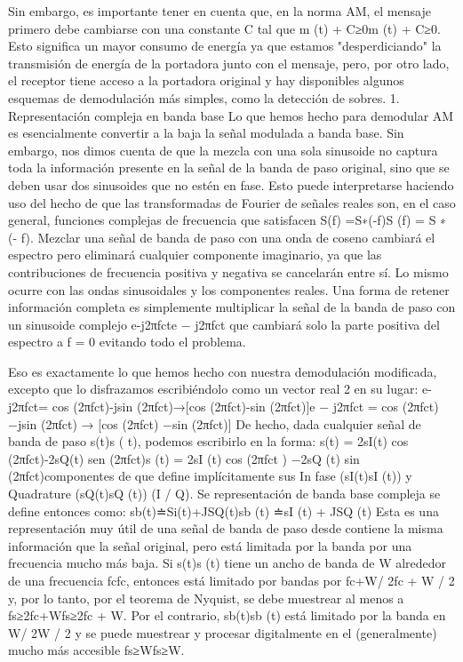 Sin embargo, es importante tener en cuenta que, en la norma AM, el mensaje primero debe cambiarse con una constante C tal que m (t) + C≥0m (t) + C≥0. Esto significa un mayor consumo de energía ya que estamos "desperdiciando" la transmisión de energía de la portadora junto con el mensaje, pero, por otro lado, el receptor tiene acceso a la portadora original y hay disponibles algunos esquemas de demodulación más simples, como la detección de sobres.
   1. Representación compleja en banda base
Lo que hemos hecho para demodular AM es esencialmente convertir a la baja la señal modulada a banda base. Sin embargo, nos dimos cuenta de que la mezcla con una sola sinusoide no captura toda la información presente en la señal de la banda de paso original, sino que se deben usar dos sinusoides que no estén en fase. Esto puede interpretarse haciendo uso del hecho de que las transformadas de Fourier de señales reales son, en el caso general, funciones complejas de frecuencia que satisfacen S(f) =S∗(-f)S (f) = S ∗ (- f). Mezclar una señal de banda de paso con una onda de coseno cambiará el espectro pero eliminará cualquier componente imaginario, ya que las contribuciones de frecuencia positiva y negativa se cancelarán entre sí. Lo mismo ocurre con las ondas sinusoidales y los componentes reales. 
Una forma de retener información completa es simplemente multiplicar la señal de la banda de paso con un sinusoide complejo e-j2πfcte − j2πfct que cambiará solo la parte positiva del espectro a f = 0 evitando todo el problema.
  

Eso es exactamente lo que hemos hecho con nuestra demodulación modificada, excepto que lo disfrazamos escribiéndolo como un vector real 2 en su lugar: 
e-j2πfct= cos (2πfct)-jsin (2πfct)→[cos (2πfct)-sin (2πfct)]e − j2πfct = cos⁡ (2πfct) −jsin⁡ (2πfct) → [cos⁡ (2πfct) −sin⁡ (2πfct)]
De hecho, dada cualquier señal de banda de paso s(t)s ( t), podemos escribirlo en la forma: 
s(t) = 2sI(t) cos (2πfct)-2sQ(t) sen (2πfct)s (t) = 2sI (t) cos⁡ (2πfct ) −2sQ (t) sin⁡ (2πfct)componentes de
que define implícitamente sus In fase (sI(t)sI (t)) y Quadrature (sQ(t)sQ (t)) (I / Q). Se representación de banda base compleja se define entonces como: 
sb(t)≐Si(t)+JSQ(t)sb (t) ≐sI (t) + JSQ (t)
Esta es una representación muy útil de una señal de banda de paso desde contiene la misma información que la señal original, pero está limitada por la banda por una frecuencia mucho más baja. Si s(t)s (t) tiene un ancho de banda de W alrededor de una frecuencia fcfc, entonces está limitado por bandas por fc+W/ 2fc + W / 2 y, por lo tanto, por el teorema de Nyquist, se debe muestrear al menos a fs≥2fc+Wfs≥2fc + W. Por el contrario, sb(t)sb (t) está limitado por la banda en W/ 2W / 2 y se puede muestrear y procesar digitalmente en el (generalmente) mucho más accesible fs≥Wfs≥W.
  

